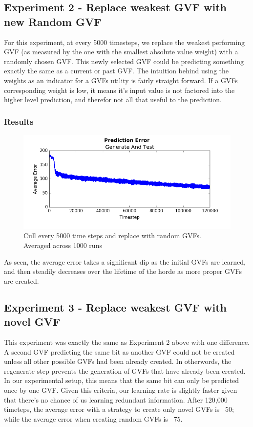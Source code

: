 \documentclass[letterpaper]{article}
\begin{document}
\subsection{Experiment 2 - Replace weakest GVF with new Random GVF}
For this experiment, at every 5000 timesteps, we replace the weakest performing GVF (as measured by the one with the smallest absolute value weight) with a randomly chosen GVF. This newly selected GVF could be predicting something exactly the same as a current or past GVF. The intuition behind using the weights as an indicator for a GVFs utility is fairly straight forward. If a GVFs corresponding weight is low, it means it's input value is not factored into the higher level prediction, and therefor not all that useful to the prediction. 

\subsubsection{Results}

\begin{figure}[H]
  \centerline{\includegraphics[width = \linewidth]{Plots/AverageErrorKullEvery5000ReplaceRandomIncludingRepeats.png}}
  \caption{Cull every 5000 time steps and replace with random GVFs. Averaged across 1000 runs}
  \label{fig:experiment}
\end{figure}	

As seen, the average error takes a significant dip as the initial GVFs are learned, and then steadily decreases over the lifetime of the horde as more proper GVFs are created. 

\subsection{Experiment 3 - Replace weakest GVF with novel GVF}
This experiment was exactly the same as Experiment 2 above with one difference. A second GVF predicting the same bit as another GVF could not be created unless all other possible GVFs had been already created. In otherwords, the regenerate step prevents the generation of GVFs that have already been created. In our experimental setup, this means that the same bit can only be predicted once by one GVF. Given this criteria, our learning rate is slightly faster given that there's no chance of us learning redundant information. After 120,000 timeteps, the average error with a strategy to create only novel GVFs is ~50; while the average error when creating random GVFs is ~75.
\end{document}
